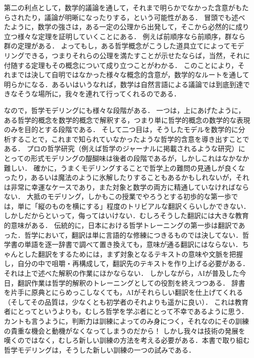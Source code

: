 \documentclass[11pt,a4paper]{jsarticle}
\begin{document}
第二の利点として，数学的議論を通して，それまで明らかでなかった含意がもたらされたり，議論が明晰になったりする，という可能性がある．
冒頭でも述べたように，数学の強さは，ある一定の公理から出発して，そこから必然的に成り立つ様々な定理を証明していくことにある．
例えば前順序なら前順序，群なら群の定理がある．
よってもし，ある哲学概念がこうした道具立てによってモデリングできる，つまりそれらの公理を満たすことが示せたならば，当然，それに付随する定理もその概念について成り立つことがわかる．
このことにより，それまでは決して自明ではなかった様々な概念的含意が，数学的なルートを通して明らかになる．あるいはいうなれば，数学は自然言語による議論では到底到達できなそうな場所に，我々を連れて行ってくれるのである．

なので，哲学モデリングにも様々な段階がある．
一つは，上にあげたように，ある哲学的概念を数学的概念で解釈する，つまり単に哲学的概念の数学的な表現のみを目的とする段階である．
そして二つ目は，そうしたモデルを数学的に分析することで，これまで知られていなかったような哲学的含意を導き出すことである．
プロの哲学研究（例えば哲学のジャーナルに掲載されるような研究）にとっての形式モデリングの醍醐味は後者の段階であるが，しかしこれはなかなか難しい．
確かに，うまくモデリングすることで哲学上の難問の見通しが良くなったり，あるいは魔法のように氷解したりすることもあるかもしれないが，それは非常に幸運なケースであり，また対象と数学の両方に精通していなければならない．
大抵のモデリング，しかもこの授業でやろうとする初歩的な第一歩では，単に「縦のものを横にする」程度のトリビアルな翻訳くらいしかできない．
しかしだからといって，侮ってはいけない．むしろそうした翻訳には大きな教育的意味がある．
伝統的に，日本における哲学トレーニングの第一歩は翻訳であった．哲学において，翻訳は単に言語的な修練につきるものでは決してない．哲学書の単語を逐一辞書で調べて置き換えても，意味が通る翻訳にはならない．ちゃんとした翻訳をするためには，まず対象となるテキストの意味や文脈を把握し，自分の中で咀嚼・再構成して，翻訳先のテキストを作り上げる必要がある．それは上で述べた解釈の作業にほかならない．
しかしながら，AIが普及した今日，翻訳作業は哲学的解釈のトレーニングとしての役割を終えつつある．
辞書を片手に原典とにらめっこしなくても，AIがそれらしい翻訳を仕上げてくれる（そしてその品質は，少なくとも初学者のそれよりも遥かに良い）．
これは教育者にとってというよりも，むしろ哲学を学ぶ者にとって不幸であるように思う．
カントも言うように，判断力は訓練によってのみ身につく，それなのにその訓練の貴重な機会と動機がなくなってしまうのだから！
しかし我々は技術の発展を嘆くのではなく，むしろ新しい訓練の方法を考える必要がある．本書で取り組む哲学モデリングは，そうした新しい訓練の一つの試みである．
\end{document}

